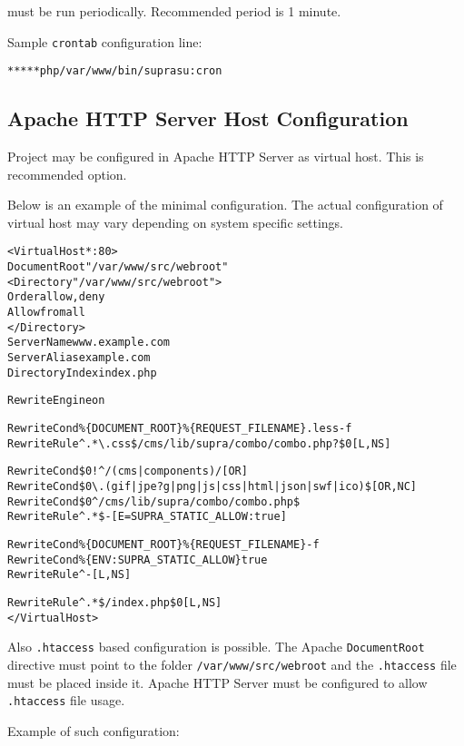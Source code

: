 \documentclass[12pt]{article}
\newcommand{\vigPathToProject}{/var/www}
\newcommand{\vigPathToSrc}{/src}
\newcommand{\vigPathToWebroot}{\vigPathToSrc/webroot}
\begin{document}
must be run periodically. Recommended period is 1 minute.

Sample \texttt{crontab} configuration line:

\begin{alltt}
* * * * * php \vigPathToProject/bin/supra su:cron
\end{alltt}

\subsection{Apache HTTP Server Host Configuration}

Project may be configured in Apache HTTP Server as virtual host. This is recommended option.

Below is an example of the minimal configuration. The actual configuration of virtual host may vary depending on system specific settings.

\begin{alltt}
<VirtualHost *:80>
  DocumentRoot "\vigPathToProject\vigPathToWebroot"
  <Directory "\vigPathToProject\vigPathToWebroot">
    Order allow,deny
    Allow from all
  </Directory>
  ServerName www.example.com
  ServerAlias example.com
  DirectoryIndex index.php

  RewriteEngine on

  RewriteCond \%\{DOCUMENT_ROOT\}\%\{REQUEST_FILENAME\}.less -f
  RewriteRule ^.*{\textbackslash}.css\$ /cms/lib/supra/combo/combo.php?\$0 [L,NS]
  
  RewriteCond \$0 !^/(cms|components)/ [OR]
  RewriteCond \$0 {\textbackslash}.(gif|jpe?g|png|js|css|html|json|swf|ico)\$ [OR,NC]
  RewriteCond \$0 ^/cms/lib/supra/combo/combo.php\$
  RewriteRule ^.*\$ - [E=SUPRA_STATIC_ALLOW:true]
  
  RewriteCond \%\{DOCUMENT_ROOT\}\%\{REQUEST_FILENAME\} -f
  RewriteCond \%\{ENV:SUPRA_STATIC_ALLOW\} true
  RewriteRule ^ - [L,NS]
  
  RewriteRule ^.*\$ /index.php\$0 [L,NS]
</VirtualHost>
\end{alltt}

Also \texttt{.htaccess} based configuration is possible. The Apache \texttt{DocumentRoot} directive must point to the folder \texttt{\vigPathToProject\vigPathToWebroot} and the \texttt{.htaccess} file must be placed inside it. Apache HTTP Server must be configured to allow \texttt{.htaccess} file usage.

Example of such configuration:
\end{document}
